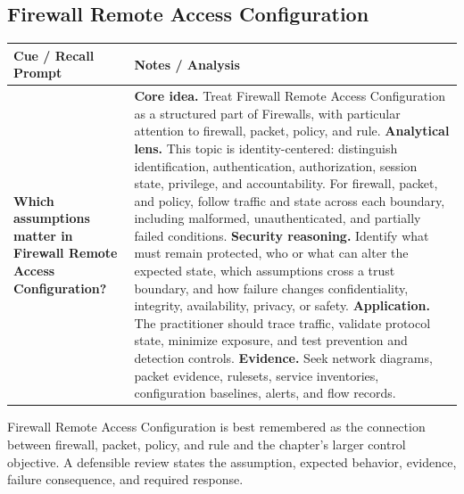 \documentclass[11pt]{article}
\newcommand{\CornellHeader}{%
\rowcolor{Navy}\color{white}\bfseries Cue / Recall Prompt & \color{white}\bfseries Notes / Analysis\\\hline}
\newcommand{\CornellRow}[2]{%
\cellcolor{CueGray}\RaggedRight\textbf{#1} & \RaggedRight #2\\\hline}
\begin{document}
\subsection*{Firewall Remote Access Configuration}
\begin{longtable}{>{\RaggedRight\arraybackslash}p{}|>{\RaggedRight\arraybackslash}p{}}
\CornellHeader
\CornellRow{Which assumptions matter in Firewall Remote Access Configuration?}{\textbf{Core idea.} Treat Firewall Remote Access Configuration as a structured part of Firewalls, with particular attention to firewall, packet, policy, and rule. \textbf{Analytical lens.} This topic is identity-centered: distinguish identification, authentication, authorization, session state, privilege, and accountability. For firewall, packet, and policy, follow traffic and state across each boundary, including malformed, unauthenticated, and partially failed conditions. \textbf{Security reasoning.} Identify what must remain protected, who or what can alter the expected state, which assumptions cross a trust boundary, and how failure changes confidentiality, integrity, availability, privacy, or safety. \textbf{Application.} The practitioner should trace traffic, validate protocol state, minimize exposure, and test prevention and detection controls. \textbf{Evidence.} Seek network diagrams, packet evidence, rulesets, service inventories, configuration baselines, alerts, and flow records.}
\end{longtable}
\begin{topicsummary}
Firewall Remote Access Configuration is best remembered as the connection between firewall, packet, policy, and rule and the chapter's larger control objective. A defensible review states the assumption, expected behavior, evidence, failure consequence, and required response.
\end{topicsummary}
\end{document}
